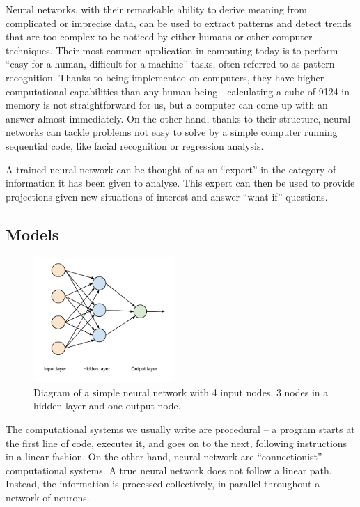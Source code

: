 Neural networks, with their remarkable ability to derive meaning from complicated or imprecise data, can be used to extract patterns and detect trends that are too complex to be noticed by either humans or other computer techniques. Their most common application in computing today is to perform ``easy-for-a-human, difficult-for-a-machine'' tasks, often referred to as pattern recognition. Thanks to being implemented on computers, they have higher computational capabilities than any human being - calculating a cube of 9124 in memory is not straightforward for us, but a computer can come up with an answer almost immediately. On the other hand, thanks to their structure, neural networks can tackle problems not easy to solve by a simple computer running sequential code, like facial recognition or regression analysis.

A trained neural network can be thought of as an ``expert'' in the category of information it has been given to analyse. This expert can then be used to provide projections given new situations of interest and answer ``what if'' questions.

\vspace{10pt}

\subsection{Models}

\begin{figure}
  \vspace{-30pt}
  \begin{center}
    \includegraphics[width=0.48\textwidth]{Figures/simpleANN}
  \end{center}
  \caption{Diagram of a simple neural network with 4 input nodes, 3 nodes in a hidden layer and one output node.}
  \label{fig:examplennn}
\end{figure}


The computational systems we usually write are procedural -- a program starts at the first line of code, executes it, and goes on to the next, following instructions in a linear fashion.
On the other hand, neural network are ``connectionist'' computational systems. A true neural network does not follow a linear path. Instead, the information is processed collectively, in parallel throughout a network of neurons.

